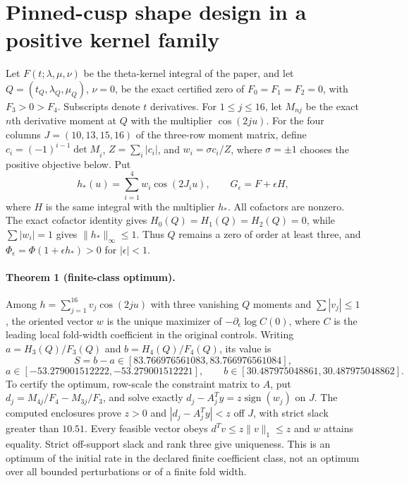 \section{Pinned-cusp shape design in a positive kernel family}

Let $F(t;\lambda,\mu,\nu)$ be the theta-kernel integral of the paper,
and let $Q=(t_Q,\lambda_Q,\mu_Q)$, $\nu=0$, be the exact certified
zero of $F_0=F_1=F_2=0$, with $F_3>0>F_4$. Subscripts denote
$t$ derivatives. For $1\leq j\leq16$, let $M_{nj}$ be the exact
$n$th derivative moment at $Q$ with the multiplier $\cos(2ju)$.
For the four columns $J=(10,13,15,16)$ of the three-row moment
matrix, define $c_i=(-1)^{i-1}\det M_{\widehat i}$,
$Z=\sum_i|c_i|$, and $w_i=\sigma c_i/Z$, where $\sigma=\pm1$
chooses the positive objective below. Put
\[
 h_*(u)=\sum_{i=1}^4w_i\cos(2J_i u),\qquad
 G_\epsilon=F+\epsilon H,
\]
where $H$ is the same integral with the multiplier $h_*$. All
cofactors are nonzero. The exact cofactor identity gives
$H_0(Q)=H_1(Q)=H_2(Q)=0$, while $\sum|w_i|=1$ gives
$\|h_*\|_\infty\leq1$. Thus $Q$ remains a zero of order at least
three, and $\Phi_\epsilon=\Phi(1+\epsilon h_*)>0$ for $|\epsilon|<1$.

\paragraph{Theorem 1 (finite-class optimum).}
Among $h=\sum_{j=1}^{16}v_j\cos(2ju)$ with three vanishing $Q$
moments and $\sum|v_j|\leq1$, the oriented vector $w$ is the unique
maximizer of $-\partial_\epsilon\log C(0)$, where $C$ is the
leading local fold-width coefficient in the original controls.
Writing $a=H_3(Q)/F_3(Q)$ and $b=H_4(Q)/F_4(Q)$, its value is
\[
 S=b-a\in[83.766976561083,83.766976561084],
\]
\[
 a\in[-53.279001512222,-53.279001512221],\qquad
 b\in[30.487975048861,30.487975048862].
\]
To certify the optimum, row-scale the constraint matrix to $A$,
put $d_j=M_{4j}/F_4-M_{3j}/F_3$, and solve exactly
$d_j-A_j^Ty=z\operatorname{sign}(w_j)$ on $J$. The computed
enclosures prove $z>0$ and $|d_j-A_j^Ty|<z$ off $J$, with
strict slack greater than $10.51$. Every feasible vector obeys
$d^Tv\leq z\|v\|_1\leq z$ and $w$ attains equality. Strict
off-support slack and rank three give uniqueness. This is an
optimum of the initial rate in the declared finite coefficient
class, not an optimum over all bounded perturbations or of a
finite fold width.

